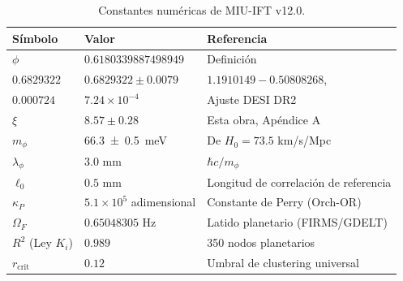 \documentclass[12pt, a4paper]{article}
\theoremstyle{miuThm}
\theoremstyle{remark}
\newcommand{\qborn}{1.1910149}
\newcommand{\qcrit}{0.50808268}
\newcommand{\DeltaCOD}{0.6829322}
\newcommand{\eps}{0.000724}
\newcommand{\phiGolden}{0.6180339887498949}
\newcommand{\OmegaF}{0.65048305}
\newcommand{\Rtwo}{0.989}
\begin{document}
\begin{table}[h!]
\centering
\caption{Constantes numéricas de MIU-IFT v12.0.}
\label{tab:constantes_completas}
\begin{tabular}{lll}
\toprule
\textbf{Símbolo} & \textbf{Valor} & \textbf{Referencia} \\
\midrule
$\phi$ & $\phiGolden$ & Definición \\
$\DeltaCOD$ & $0.6829322 \pm 0.0079$ & $\qborn-\qcrit$, \cite{IBM2025} \\
$\eps$ & $7.24\times10^{-4}$ & Ajuste DESI DR2 \\
$\xi$ & $8.57 \pm 0.28$ & Esta obra, Apéndice A \\
$m_\phi$ & \SI{66.3 \pm 0.5}{\milli\electronvolt} & De $H_0 = 73.5$ km/s/Mpc \\
$\lambda_\phi$ & $3.0$ mm & $\hbar c/m_\phi$ \\
$\ell_0$ & $0.5$ mm & Longitud de correlación de referencia \\
$\kappa_P$ & $5.1\times10^5$ adimensional & Constante de Perry (Orch-OR) \\
$\Omega_F$ & $\OmegaF$ Hz & Latido planetario (FIRMS/GDELT) \\
$R^2$ (Ley $K_i$) & $\Rtwo$ & 350 nodos planetarios \\
$r_{\text{crit}}$ & $0.12$ & Umbral de clustering universal \\
\bottomrule
\end{tabular}
\end{table}
\end{document}
